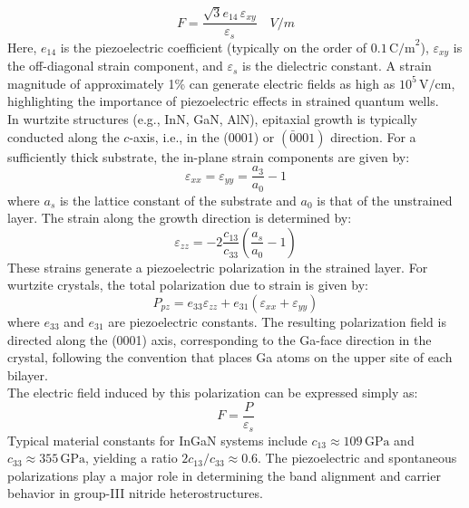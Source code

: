 \begin{equation}
	F = \frac{\sqrt{3} e_{14} \, \varepsilon_{xy}}{\varepsilon_s} \quad V/m
\end{equation}
Here, \( e_{14} \) is the piezoelectric coefficient (typically on the order of \( 0.1 \, \text{C/m}^2 \)), \( \varepsilon_{xy} \) is the off-diagonal strain component, and \( \varepsilon_s \) is the dielectric constant. A strain magnitude of approximately 1\% can generate electric fields as high as \( 10^5 \, \text{V/cm} \), highlighting the importance of piezoelectric effects in strained quantum wells.\\
In wurtzite structures (e.g., InN, GaN, AlN), epitaxial growth is typically conducted along the \( c \)-axis, i.e., in the (0001) or \( (\bar{0}001) \) direction. For a sufficiently thick substrate, the in-plane strain components are given by:
\begin{equation}
	\varepsilon_{xx} = \varepsilon_{yy} = \frac{a_3}{a_0} - 1
\end{equation}
where \( a_s \) is the lattice constant of the substrate and \( a_0 \) is that of the unstrained layer. The strain along the growth direction is determined by:
\begin{equation}
	\varepsilon_{zz} = -2 \frac{c_{13}}{c_{33}} \left( \frac{a_s}{a_0} - 1 \right)
\end{equation}
These strains generate a piezoelectric polarization in the strained layer. For wurtzite crystals, the total polarization due to strain is given by:
\begin{equation}
	P_{pz} = e_{33} \varepsilon_{zz} + e_{31} (\varepsilon_{xx} + \varepsilon_{yy})
\end{equation}
where \( e_{33} \) and \( e_{31} \) are piezoelectric constants. The resulting polarization field is directed along the (0001) axis, corresponding to the Ga-face direction in the crystal, following the convention that places Ga atoms on the upper site of each bilayer.\\
The electric field induced by this polarization can be expressed simply as:
\begin{equation}
	F = \frac{P}{\varepsilon_s}
\end{equation}
Typical material constants for InGaN systems include \( c_{13} \approx 109 \, \text{GPa} \) and \( c_{33} \approx 355 \, \text{GPa} \), yielding a ratio \( 2c_{13}/c_{33} \approx 0.6 \). The piezoelectric and spontaneous polarizations play a major role in determining the band alignment and carrier behavior in group-III nitride heterostructures.


